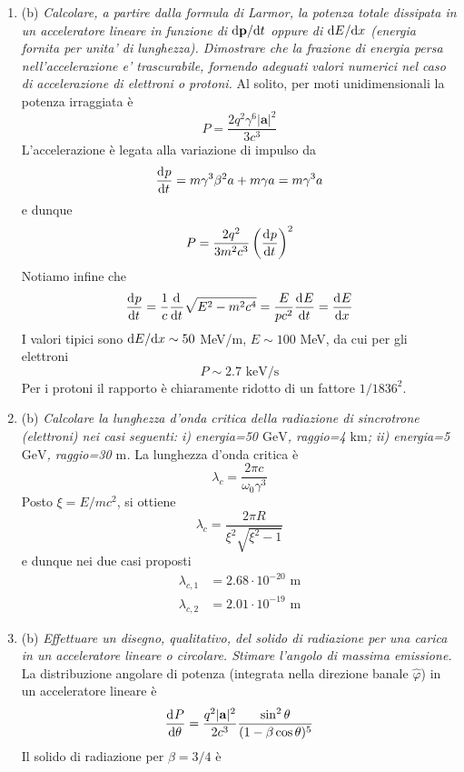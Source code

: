 \documentclass{article}
\renewcommand{\b}{(b)}
\renewcommand{\t}[1]{\textit{ #1}}
\renewcommand{\vec}[1]{\mathbf{#1}}
\begin{document}
\begin{enumerate}
	\item\b\t{Calcolare, a partire dalla formula di Larmor, la potenza totale dissipata in un
		acceleratore lineare in funzione di $\d \vec{p}/\d t$ oppure di $\mathrm{d} E/\mathrm{d} x$ (energia fornita per unita’ di
		lunghezza). Dimostrare che la frazione di energia persa nell’accelerazione e’
		trascurabile, fornendo adeguati valori numerici nel caso di accelerazione di
		elettroni o protoni.}
	Al solito, per moti unidimensionali la potenza irraggiata è
	\[P=\frac{2q^2\gamma^6|\vec{a}|^2}{3c^3}\]
	L'accelerazione è legata alla variazione di impulso da
	\[\dfrac{\mathrm{d} ^{}p}{\mathrm{d} {t}^{}}=m\gamma^3\beta^2a+m\gamma a=m\gamma^3a\]
	e dunque
	\[P=\frac{2q^2}{3m^2c^3}\left(\dfrac{\mathrm{d} ^{}p}{\mathrm{d} {t}^{}}\right)^2\]
	Notiamo infine che
	\[\dfrac{\mathrm{d} ^{}p}{\mathrm{d} {t}^{}}=\frac{1}{c}\dfrac{\mathrm{d} ^{}}{\mathrm{d} {t}^{}}\sqrt{E^2-m^2c^4}=\frac{E}{pc^2}\dfrac{\mathrm{d} ^{}E}{\mathrm{d} {t}^{}}=\dfrac{\mathrm{d} ^{}E}{\mathrm{d} {x}^{}}\]
	I valori tipici sono $\mathrm{d} E/\mathrm{d} x\sim50$ MeV/m, $E\sim100$ MeV, da cui per gli elettroni
	\[P\sim 2.7\textrm{ keV/s}\]
	Per i protoni il rapporto è chiaramente ridotto di un fattore $1/1836^2$.
	\item\b\t{Calcolare la lunghezza d’onda critica della radiazione di sincrotrone (elettroni) nei
		casi seguenti: i) energia=50 $\mathrm{ GeV}$, raggio=4 $\mathrm{ km}$; ii) energia=5 $\mathrm{ GeV}$, raggio=30 $\mathrm{ m}$.}
	La lunghezza d'onda critica è
	\[\lambda_c=\frac{2\pi c}{\omega_0\gamma^3}\]
	Posto $\xi=E/mc^2$, si ottiene
	\[\lambda_c=\frac{2\pi R}{\xi^2\sqrt{\xi^2-1}}\]
	e dunque nei due casi proposti
	\begin{align*}
		\lambda_{c,1}&=2.68\cdot10^{-20}\textrm{ m}\\\lambda_{c,2}&=2.01\cdot10^{-19}\textrm{ m}
	\end{align*}
	\item\b\t{Effettuare un disegno, qualitativo, del solido di radiazione per una carica in un
		acceleratore lineare o circolare. Stimare l’angolo di massima emissione.}
	La distribuzione angolare di potenza (integrata nella direzione banale $\hat{\varphi}$) in un acceleratore lineare è
	\[\der{P}{\theta}=\frac{q^2|\vec{a}|^2}{2c^3}\frac{\sin^2\theta}{(1-\beta\cos\theta)^5}\]
	Il solido di radiazione per $\beta=3/4$ è 
	\begin{center}
	\end{center}

\end{enumerate}
\end{document}
